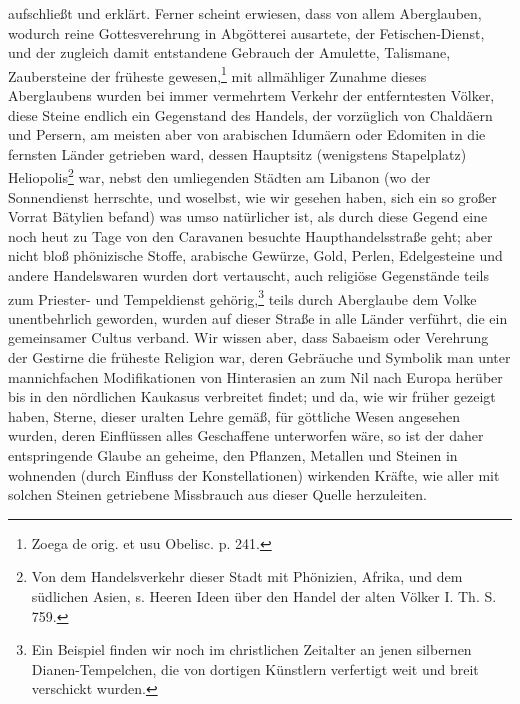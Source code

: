 \documentclass[a4paper, 11pt, oneside, polutonikogreek, german]{article}
\begin{document}
aufschließt und erklärt. Ferner scheint erwiesen, dass von allem Aberglauben, wodurch reine Gottesverehrung in Abgötterei ausartete, der Fetischen-Dienst, und der zugleich damit entstandene Gebrauch der Amulette, Talismane, Zaubersteine der früheste gewesen,\footnote{Zoega de orig. et usu Obelisc. p. 241.} mit allmähliger Zunahme dieses Aberglaubens wurden bei immer vermehrtem Verkehr der entferntesten Völker, diese Steine endlich ein Gegenstand des Handels, der vorzüglich von Chaldäern und Persern, am meisten aber von arabischen Idumäern oder Edomiten in die fernsten Länder getrieben ward, dessen Hauptsitz (wenigstens Stapelplatz) Heliopolis\footnote{Von dem Handelsverkehr dieser Stadt mit Phönizien, Afrika, und dem südlichen Asien, s. Heeren Ideen über den Handel der alten Völker I. Th. S. 759.} war, nebst den umliegenden Städten am Libanon (wo der Sonnendienst herrschte, und woselbst, wie wir gesehen haben, sich ein so großer Vorrat Bätylien befand) was umso natürlicher ist, als durch diese Gegend eine noch heut zu Tage von den Caravanen besuchte Haupthandelsstraße geht; aber nicht bloß phönizische Stoffe, arabische Gewürze, Gold, Perlen, Edelgesteine und andere Handelswaren wurden dort vertauscht, auch religiöse Gegenstände teils zum Priester- und Tempeldienst gehörig,\footnote{Ein Beispiel finden wir noch im christlichen Zeitalter an jenen silbernen Dianen-Tempelchen, die von dortigen Künstlern verfertigt weit und breit verschickt wurden.} teils durch Aberglaube dem Volke unentbehrlich geworden, wurden auf dieser Straße in alle Länder verführt, die ein gemeinsamer Cultus verband. Wir wissen aber, dass Sabaeism oder Verehrung der Gestirne die früheste Religion war, deren Gebräuche und Symbolik man unter mannichfachen Modifikationen von Hinterasien an zum Nil nach Europa herüber bis in den nördlichen Kaukasus verbreitet findet; und da, wie wir früher gezeigt haben, Sterne, dieser uralten Lehre gemäß, für göttliche Wesen angesehen wurden, deren Einflüssen alles Geschaffene unterworfen wäre, so ist der daher entspringende Glaube an geheime, den Pflanzen, Metallen und Steinen in wohnenden (durch Einfluss der Konstellationen) wirkenden Kräfte, wie aller mit solchen Steinen getriebene Missbrauch aus dieser Quelle herzuleiten.
\end{document}
